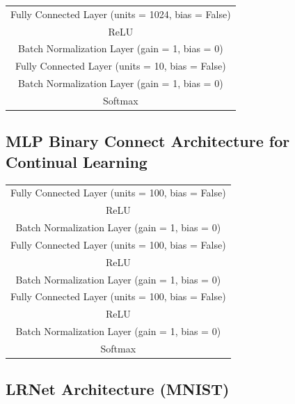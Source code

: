 \begin{table}[H]
\begin{center}
\begin{tabular}{ c }
   Fully Connected Layer (units = 1024, bias = False) \\      
   ReLU \\      
   Batch Normalization Layer (gain = 1, bias = 0) \\ \hline
   Fully Connected Layer (units = 10, bias = False)  \\      
   Batch Normalization Layer (gain = 1, bias = 0) \\
   Softmax \\ \hline
\end{tabular}
\end{center}
\end{table}


\subsection*{MLP Binary Connect Architecture for Continual Learning}

\begin{table}[H]
\begin{center}
\begin{tabular}{  c  }
\hline
   Fully Connected Layer (units = 100, bias = False) \\
   ReLU  \\
   Batch Normalization Layer (gain = 1, bias = 0) \\ \hline
   Fully Connected Layer (units = 100, bias = False)  \\
   ReLU  \\
   Batch Normalization Layer (gain = 1, bias = 0) \\ \hline
   Fully Connected Layer (units = 100, bias = False)   \\
   ReLU \\
   Batch Normalization Layer (gain = 1, bias = 0)  \\ 
   Softmax \\\hline
\end{tabular}
\end{center}
\end{table}


\subsection*{LRNet Architecture (MNIST)}

